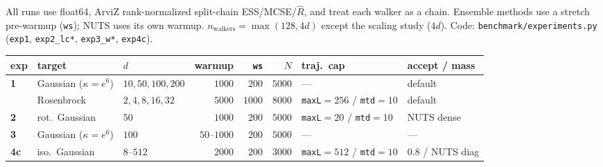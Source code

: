 \documentclass[11pt]{article}
\begin{document}
All runs use float64, ArviZ rank-normalized split-chain ESS/MCSE/$\hat R$, and
treat each walker as a chain. Ensemble methods use a stretch pre-warmup
(\texttt{ws}); NUTS uses its own warmup. $n_{\text{walkers}}=\max(128,4d)$
except the scaling study ($4d$). Code: \texttt{benchmark/experiments.py}
(\texttt{exp1}, \texttt{exp2\_lc*}, \texttt{exp3\_w*}, \texttt{exp4c}).
\begin{center}\scriptsize
\begin{tabular}{l l l r r r l l}
\toprule
exp & target & $d$ & warmup & \texttt{ws} & $N$ & traj.\ cap & accept / mass\\
\midrule
\textbf{1} & Gaussian ($\kappa{=}e^6$) & $10,50,100,200$ & $1000$ & $200$ & $5000$ & — & default\\
           & Rosenbrock & $2,4,8,16,32$ & $5000$ & $1000$ & $8000$ & \texttt{maxL}$=256$ / \texttt{mtd}$=10$ & default\\
\textbf{2} & rot.\ Gaussian & $50$ & $1000$ & $200$ & $5000$ & \texttt{maxL}$=20$ / \texttt{mtd}$=10$ & NUTS dense\\
\textbf{3} & Gaussian ($\kappa{=}e^6$) & $100$ & $50$--$1000$ & $200$ & $5000$ & — & —\\
\textbf{4c} & iso.\ Gaussian & $8$--$512$ & $2000$ & $200$ & $3000$ & \texttt{maxL}$=512$ / \texttt{mtd}$=10$ & $0.8$ / NUTS diag\\
\bottomrule
\end{tabular}
\end{center}

\end{document}
